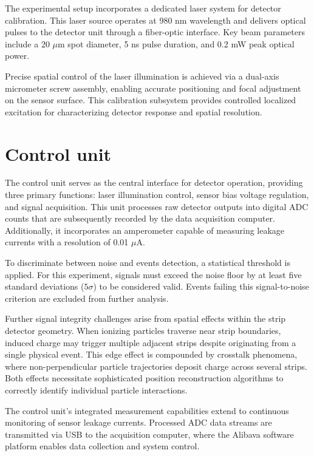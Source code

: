 The experimental setup incorporates a dedicated laser system for detector calibration. This laser source operates at 980 nm wavelength and delivers optical pulses to the detector unit through a fiber-optic interface. Key beam parameters include a 20 $\mu$m spot diameter, 5 ns pulse duration, and 0.2 mW peak optical power.

Precise spatial control of the laser illumination is achieved via a dual-axis micrometer screw assembly, enabling accurate positioning and focal adjustment on the sensor surface. This calibration subsystem provides controlled localized excitation for characterizing detector response and spatial resolution.
\section{Control unit}

The control unit serves as the central interface for detector operation, providing three primary functions: laser illumination control, sensor bias voltage regulation, and signal acquisition. This unit processes raw detector outputs into digital ADC counts that are subsequently recorded by the data acquisition computer. Additionally, it incorporates an amperometer capable of measuring leakage currents with a resolution of 0.01 $\mu$A.

To discriminate between noise and events detection, a statistical threshold is applied. For this experiment, signals must exceed the noise floor by at least five standard deviations ($5\sigma$) to be considered valid. Events failing this signal-to-noise criterion are excluded from further analysis.

Further signal integrity challenges arise from spatial effects within the strip detector geometry. When ionizing particles traverse near strip boundaries, induced charge may trigger multiple adjacent strips despite originating from a single physical event. This edge effect is compounded by crosstalk phenomena, where non-perpendicular particle trajectories deposit charge across several strips. Both effects necessitate sophisticated position reconstruction algorithms to correctly identify individual particle interactions.

The control unit's integrated measurement capabilities extend to continuous monitoring of sensor leakage currents. Processed ADC data streams are transmitted via USB to the acquisition computer, where the Alibava software platform enables data collection and system control.

